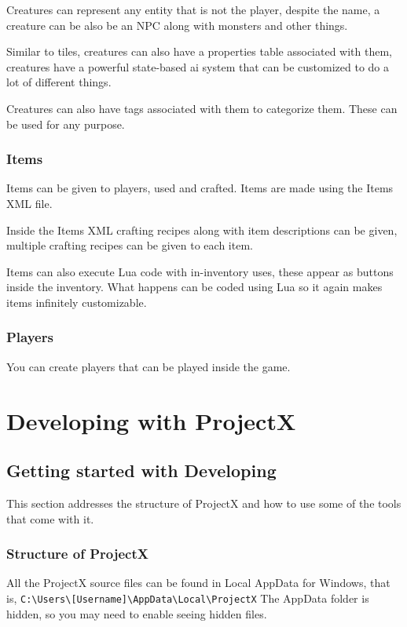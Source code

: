 \documentclass{book}
\begin{document}
	Creatures can represent any entity that is not the player, despite the name, a creature can be also be an NPC along with monsters and other things.
	
	Similar to tiles, creatures can also have a properties table associated with them, creatures have a powerful state-based ai system that can be customized to do a lot of different things.

	Creatures can also have tags associated with them to categorize them. These can be used for any purpose.
	
	\section{Items}
	Items can be given to players, used and crafted. Items are made using the Items XML file.
	
	Inside the Items XML crafting recipes along with item descriptions can be given, multiple crafting recipes can be given to each item.
	
	Items can also execute Lua code with in-inventory uses, these appear as buttons inside the inventory. What happens can be coded using Lua so it again makes items infinitely customizable.
	
	\section{Players}
	You can create players that can be played inside the game.
	
	\part{Developing with ProjectX}
	
	\chapter{Getting started with Developing}
	This section addresses the structure of ProjectX and how to use some of the tools that come with it.
	
	\section{Structure of ProjectX}
	All the ProjectX source files can be found in Local AppData for Windows, that is, \texttt{C:\textbackslash Users\textbackslash [Username]\textbackslash AppData\textbackslash Local\textbackslash ProjectX} The AppData folder is hidden, so you may need to enable seeing hidden files.
	
\end{document}
